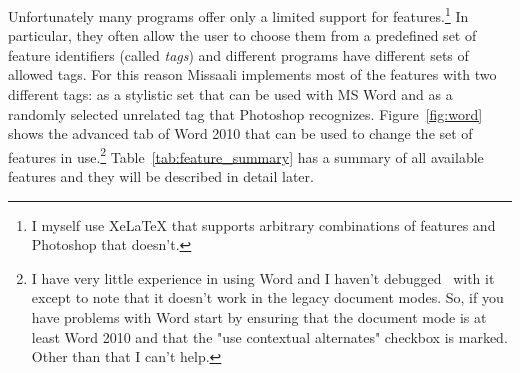 \documentclass[a4paper, 12pt]{article}
\begin{document}
Unfortunately many programs offer only a limited support for
features.\footnote{I myself use XeLaTeX that supports arbitrary
  combinations of features and Photoshop that doesn't.} In particular,
they often allow the user to choose them from a predefined set of
feature identifiers (called \emph{tags}) and different programs have
different sets of allowed tags. For this reason Missaali implements
most of the features with two different tags: as a stylistic set that
can be used with MS Word and as a randomly selected unrelated tag that
Photoshop recognizes. Figure~\ref{fig:word} shows the advanced tab of
Word 2010 that can be used to change the set of features in
use.\footnote{I have very little experience in using Word and I
  haven't debugged \Missaali\ with it except to note that it doesn't
  work in the legacy document modes. So, if you have problems with
  Word start by ensuring that the document mode is at least Word 2010
  and that the "use contextual alternates" checkbox is marked. Other
  than that I can't help.} Table~\ref{tab:feature_summary} has a
summary of all available features and they will be described in detail
later.
\end{document}

